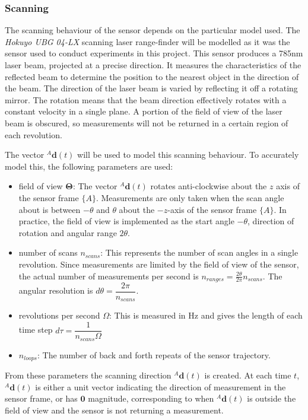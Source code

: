\subsubsection{Scanning} \label{sec:scanmodel}
The scanning behaviour of the sensor depends on the particular model used. The \textit{Hokuyo UBG 04-LX} scanning laser range-finder will be modelled as it was the sensor used to conduct experiments in this project. This sensor produces a 785nm laser beam, projected at a precise direction. It measures the characteristics of the reflected beam to determine the position to the nearest object in the direction of the beam. The direction of the laser beam is varied by reflecting it off a rotating mirror. The rotation means that the beam direction effectively rotates with a constant velocity in a single plane. A portion of the field of view of the laser beam is obscured, so measurements will not be returned in a certain region of each revolution.

The vector ${^{A}\mathbf{d}(t)}$ will be used to model this scanning behaviour.
To accurately model this, the following parameters are used:
\begin{itemize}
\item field of view $\mathbf{\Theta}$: The vector ${^{A}\mathbf{d}(t)}$ rotates anti-clockwise about the $z$ axis of the sensor frame $\{A\}$. Measurements are only taken when the scan angle about is between $-\theta$ and $\theta$ about the $-z$-axis of the sensor frame $\{A\}$. In practice, the field of view is implemented as the start angle $-\theta$, direction of rotation and angular range $2\theta$.
\item number of scans $n_{scans}$: This represents the number of scan angles in a single revolution. Since measurements are limited by the field of view of the sensor, the actual number of measurements per second is $n_{ranges} = \frac{2\theta}{2\pi}n_{scans}$. The angular resolution is $d\theta = \dfrac{2\pi}{n_{scans}}$.
\item revolutions per second $\Omega$: This is measured in Hz and gives the length of each time step $d\tau = \dfrac{1}{n_{scans}\Omega}$
\item $n_{loops}$: The number of back and forth repeats of the sensor trajectory.
\end{itemize}
From these parameters the scanning direction ${^{A}\mathbf{d}(t)}$ is created. At each time $t$, ${^{A}\mathbf{d}(t)}$ is either a unit vector indicating the direction of measurement in the sensor frame, or has $\mathbf{0}$ magnitude, corresponding to when ${^{A}\mathbf{d}(t)}$ is outside the field of view and the sensor is not returning a measurement.

